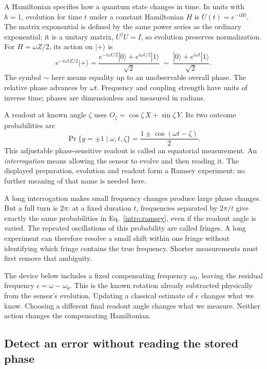 \documentclass[11pt,a4paper]{article}
\numberwithin{equation}{section}
\theoremstyle{remark}
\begin{document}
A Hamiltonian specifies how a quantum state changes in time. In units with
$\hbar=1$, evolution for time $t$ under a constant Hamiltonian $H$ is
$U(t)=e^{-iHt}$. The matrix exponential is defined by the same power series
as the ordinary exponential; it is a unitary matrix,
$U^\dagger U=I$, so evolution preserves normalization.
For $H=\omega Z/2$, its action on $|+\rangle$ is
\begin{equation}
 e^{-i\omega tZ/2}|+\rangle
 =\frac{e^{-i\omega t/2}|0\rangle+e^{i\omega t/2}|1\rangle}{\sqrt2}
 \ \sim\ \frac{|0\rangle+e^{i\omega t}|1\rangle}{\sqrt2}.
 \label{intro:clock}
\end{equation}
The symbol $\sim$ here means equality up to an unobservable overall phase.
The relative phase advances by $\omega t$. Frequency and coupling strength
have units of inverse time; phases are dimensionless and measured in radians.

A readout at known angle $\zeta$ uses
$O_\zeta=\cos\zeta\,X+\sin\zeta\,Y$. Its two outcome probabilities are
\begin{equation}
 \Pr\{y=\pm1\mid\omega,t,\zeta\}
 =\frac{1\pm\cos(\omega t-\zeta)}2.
 \label{intro:ramsey}
\end{equation}
This adjustable phase-sensitive readout is called an equatorial measurement.
An \emph{interrogation} means allowing the sensor to evolve and then
reading it. The displayed preparation, evolution and readout form a
Ramsey experiment; no further meaning of that name is needed here.

A long interrogation makes small frequency changes produce large phase
changes. But a full turn is $2\pi$: at a fixed duration $t$, frequencies
separated by $2\pi/t$ give exactly the same probabilities in
Eq.~\eqref{intro:ramsey}, even if the readout angle is varied.
The repeated oscillations of this probability are called fringes.
A long experiment can therefore resolve a small shift within one fringe
without identifying which fringe contains the true frequency.
Shorter measurements must first remove that ambiguity.

The device below includes a fixed compensating frequency $\omega_0$,
leaving the residual frequency $\epsilon=\omega-\omega_0$. This is the
known rotation already subtracted physically from the sensor's evolution.
Updating a classical estimate of $\epsilon$ changes what we know. Choosing
a different final readout angle changes what we measure. Neither action
changes the compensating Hamiltonian.

\subsection{Detect an error without reading the stored phase}
\end{document}
